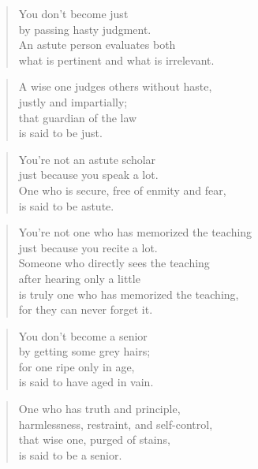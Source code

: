 \documentclass[12pt,openany]{book}%
\begin{document}
\begin{verse}%
You don’t become just \\
by passing hasty judgment. \\
An astute person evaluates both \\
what is pertinent and what is irrelevant. 

%
\end{verse}

\begin{verse}%
A wise one judges others without haste, \\
justly and impartially; \\
that guardian of the law \\
is said to be just. 

%
\end{verse}

\begin{verse}%
You’re not an astute scholar \\
just because you speak a lot. \\
One who is secure, free of enmity and fear, \\
is said to be astute. 

%
\end{verse}

\begin{verse}%
You’re not one who has memorized the teaching \\
just because you recite a lot. \\
Someone who directly sees the teaching \\
after hearing only a little \\
is truly one who has memorized the teaching, \\
for they can never forget it. 

%
\end{verse}

\begin{verse}%
You don’t become a senior \\
by getting some grey hairs; \\
for one ripe only in age, \\
is said to have aged in vain. 

%
\end{verse}

\begin{verse}%
One who has truth and principle, \\
harmlessness, restraint, and self-control, \\
that wise one, purged of stains, \\
is said to be a senior. 

%
\end{verse}
\end{document}
